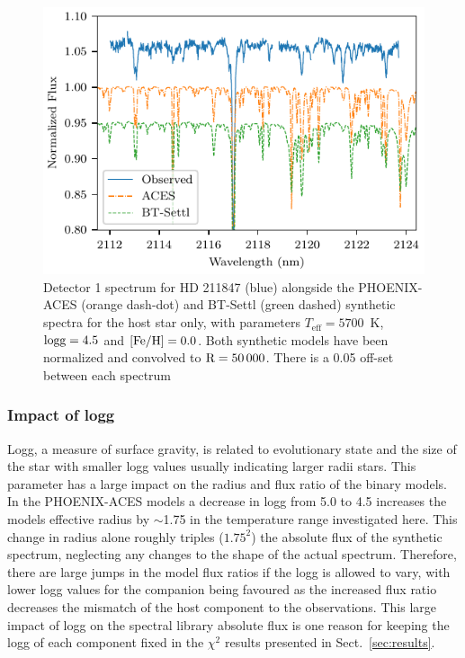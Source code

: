 \documentclass[fleqn,usenatbib]{mnras}
\begin{document}
    \begin{figure}
        \centering
        \includegraphics[width=0.95\hsize]{images/fig10.pdf}
        \caption{Detector 1 spectrum for {HD 211847} (blue) alongside the PHOENIX-ACES (orange dash-dot) and {BT-Settl} (green dashed) synthetic spectra for the host star only, with parameters \(T_{\textrm{eff}}=5700\)~K, \(\rm logg=4.5\) and \(\rm [Fe/H]=0.0\). Both synthetic models have been normalized and convolved to \(\rm R=50\,000\). There is a 0.05 off-set between each spectrum}
        \label{fig:hd211847-models}
    \end{figure}
    
    \subsubsection{Impact of logg}
    \label{subsubsec:logg}
    Logg, a measure of surface gravity, is related to evolutionary state and the size of the star with smaller logg values usually indicating larger radii stars. This parameter has a large impact on the radius and flux ratio of the binary models. In the PHOENIX-ACES models a decrease in logg from 5.0 to 4.5 increases the models effective radius by \(\sim\)1.75 in the temperature range investigated here. This change in radius alone roughly triples (\(1.75^2\)) the absolute flux of the synthetic spectrum, neglecting any changes to the shape of the actual spectrum. Therefore, there are large jumps in the model flux ratios if the logg is allowed to vary, with lower logg values for the companion being favoured as the increased flux ratio decreases the mismatch of the host component to the observations. This large impact of logg on the spectral library absolute flux is one reason for keeping the logg of each component fixed in the \(\chi^2\) results presented in Sect.~\ref{sec:results}.
    
\end{document}
